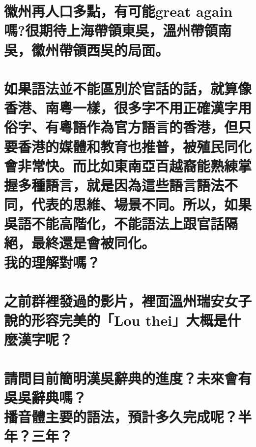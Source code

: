 \chapter[徽州再人口多點，有可能great again嗎?很期待上海帶領東吳，溫州帶領南吳，徽州帶領西吳的局面。]{徽州再人口多點，有可能great again嗎?很期待上海帶領東吳，溫州帶領南吳，徽州帶領西吳的局面。}

\chapter[如果語法並不能區別於官話的話，就算像香港、南粵一樣，很多字不用正確漢字用俗字、有粵語作為官方語言的香港，但只要香港的媒體和教育也推普，被殖民同化會非常快。而比如東南亞百越裔能熟練掌握多種語言，就是因為這些語言語法不同，代表的思維、場景不同。所以，如果吳語不能高階化，不能語法上跟官話隔絕，最終還是會被同化。 我的理解對嗎？]{如果語法並不能區別於官話的話，就算像香港、南粵一樣，很多字不用正確漢字用俗字、有粵語作為官方語言的香港，但只要香港的媒體和教育也推普，被殖民同化會非常快。而比如東南亞百越裔能熟練掌握多種語言，就是因為這些語言語法不同，代表的思維、場景不同。所以，如果吳語不能高階化，不能語法上跟官話隔絕，最終還是會被同化。 \\[0.35em] 我的理解對嗎？}

\chapter[之前群裡發過的影片，裡面溫州瑞安女子說的形容完美的「Lou thei」大概是什麼漢字呢？]{之前群裡發過的影片，裡面溫州瑞安女子說的形容完美的「Lou thei」大概是什麼漢字呢？}

\chapter[請問目前簡明漢吳辭典的進度？未來會有吳吳辭典嗎？ 播音體主要的語法，預計多久完成呢？半年？三年？]{請問目前簡明漢吳辭典的進度？未來會有吳吳辭典嗎？ \\[0.35em] 播音體主要的語法，預計多久完成呢？半年？三年？}

